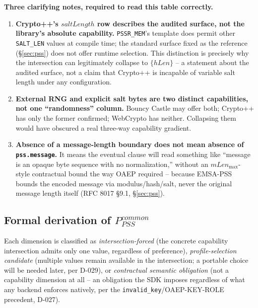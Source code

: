 \documentclass[11pt,a4paper]{article}
\begin{document}
\textbf{Three clarifying notes, required to read this table correctly.}
\begin{enumerate}
\item \textbf{Crypto++'s $saltLength$ row describes the audited surface, not the library's absolute capability.} \texttt{PSSR\_MEM}'s template does permit other \texttt{SALT\_LEN} values at compile time; the standard surface fixed as the reference (\S\ref{sec:pss}) does not offer runtime selection. This distinction is precisely why the intersection can legitimately collapse to $\{hLen\}$ -- a statement about the audited surface, not a claim that Crypto++ is incapable of variable salt length under any configuration.
\item \textbf{External RNG and explicit salt bytes are two distinct capabilities, not one ``randomness'' column.} Bouncy Castle may offer both; Crypto++ has only the former confirmed; WebCrypto has neither. Collapsing them would have obscured a real three-way capability gradient.
\item \textbf{Absence of a message-length boundary does not mean absence of \texttt{pss.message}.} It means the eventual clause will read something like ``message is an opaque byte sequence with no normalization,'' without an $mLen_{\max}$-style contractual bound the way OAEP required -- because EMSA-PSS bounds the encoded message via modulus/hash/salt, never the original message length itself (RFC 8017 \S9.1, \S\ref{sec:pss}).
\end{enumerate}

\subsection{Formal derivation of \texorpdfstring{$P_{PSS}^{common}$}{P PSS common}}\label{sec:pss-common}
Each dimension is classified as \emph{intersection-forced} (the concrete capability intersection admits only one value, regardless of preference), \emph{profile-selection candidate} (multiple values remain available in the intersection; a portable choice will be needed later, per D-029), or \emph{contractual semantic obligation} (not a capability dimension at all -- an obligation the SDK imposes regardless of what any backend enforces natively, per the \texttt{invalid\_key}/OAEP-KEY-ROLE precedent, D-027).
\end{document}
